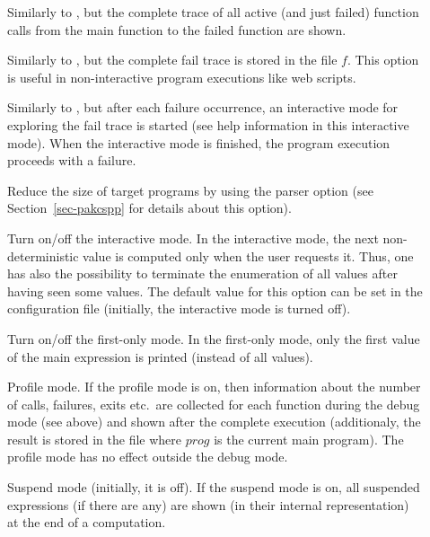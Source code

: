 \begin{description}
\item[]
Similarly to , but the complete trace
of all active (and just failed) function calls from the main function
to the failed function are shown.

\item[]
Similarly to , but the complete fail trace
is stored in the file $f$. This option is useful in non-interactive
program executions like web scripts.

\item[]
Similarly to , but after each failure occurrence,
an interactive mode for exploring the fail trace is started
(see help information in this interactive mode).
When the interactive mode is finished, the program execution
proceeds with a failure.

\item[]
Reduce the size of target programs by using the
parser option 
(see Section~\ref{sec-pakcspp} for details about this option).

\item[]
Turn on/off the interactive mode.
In the interactive mode, the next non-deterministic value
is computed only when the user requests it.
Thus, one has also the possibility to terminate the
enumeration of all values after having seen some values.
The default value for this option can be set in the
configuration file \ccode{\curryrc} (initially, the interactive
mode is turned off).

\item[]
Turn on/off the first-only mode.
In the first-only mode, only the first value
of the main expression is printed (instead of all values).

\item[] Profile mode.
If the profile mode is on, then information about
the number of calls, failures, exits etc.\ are collected for
each function during the debug mode (see above) and shown
after the complete execution (additionaly, the result is stored
in the file  where $prog$ is the current main program).
The profile mode has no effect outside the debug mode.


\item[] Suspend mode (initially, it is off).
If the suspend mode is on, all suspended expressions
(if there are any) are shown (in their internal representation) at the end
of a computation.


\end{description}
